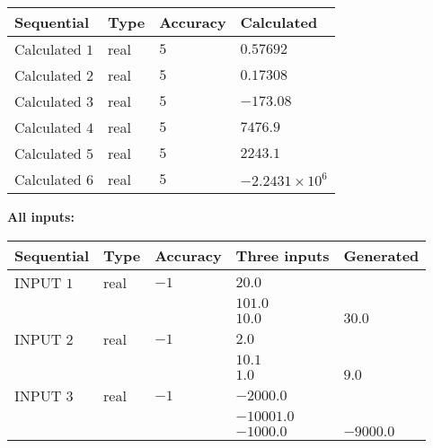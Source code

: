 \documentclass[12pt]{article}
\begin{document}
   
   
   
\noindent{}
   
   
  
  
\noindent\begin{tabular}{|l|l|l|l|}
\hline
 Sequential & Type & Accuracy & Calculated \\ 
\hline
 
 
  Calculated $            1 $ & real & $            5  $ & 
 $ 0.57692 $ 
 \\  \hline  
 
 
  Calculated $            2 $ & real & $            5  $ & 
 $ 0.17308 $ 
 \\  \hline  
 
 
  Calculated $            3 $ & real & $            5  $ & 
 $ -173.08 $ 
 \\  \hline  
 
 
  Calculated $            4 $ & real & $            5  $ & 
 $ 7476.9 $ 
 \\  \hline  
 
 
  Calculated $            5 $ & real & $            5  $ & 
 $ 2243.1 $ 
 \\  \hline  
 
 
  Calculated $            6 $ & real & $            5  $ & 
 $ -2.2431 \times 10^{6} $ 
 \\  \hline  
 \end{tabular}
   
   
   
   
\noindent\vspace{0.1in}\hspace{-0.08in} {\textbf{\Large{All inputs: }}}
   
   
  
  
\noindent\begin{tabular}{|l|l|l|l|l|}
\hline
 Sequential & Type & Accuracy & Three inputs & Generated \\ 
\hline
 
 
  INPUT $            1 $ & real & $           -1  $ & $
 20.0
  $ & \\
  & & &  $
 101.0
  $ & \\
  & & &  $
 10.0
 $ & $ 30.0 $ 
 \\  \hline  
 
 
  INPUT $            2 $ & real & $           -1  $ & $
 2.0
  $ & \\
  & & &  $
 10.1
  $ & \\
  & & &  $
 1.0
 $ & $ 9.0 $ 
 \\  \hline  
 
 
  INPUT $            3 $ & real & $           -1  $ & $
 -2000.0
  $ & \\
  & & &  $
 -10001.0
  $ & \\
  & & &  $
 -1000.0
 $ & $ -9000.0 $ 
 \\  \hline  
 \end{tabular}
   
\end{document}
